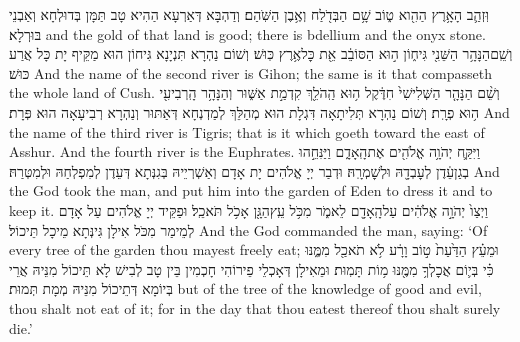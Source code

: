 {וּֽזְהַ֛ב הָאָ֥רֶץ הַהִ֖וא ט֑וֹב שָׁ֥ם הַבְּדֹ֖לַח וְאֶ֥בֶן הַשֹּֽׁהַם׃}
{וְדַהְבָּא דְּאַרְעָא הַהִיא טָב תַּמָּן בְּדוּלְחָא וְאַבְנֵי בּוּרְלָא׃}
{and the gold of that land is good; there is bdellium and the onyx stone.}{}
{וְשֵֽׁם\maqqaf הַנָּהָ֥ר הַשֵּׁנִ֖י גִּיח֑וֹן ה֣וּא הַסּוֹבֵ֔ב אֵ֖ת כׇּל\maqqaf אֶ֥רֶץ כּֽוּשׁ׃}
{וְשׁוֹם נַהְרָא תִּנְיָנָא גִּיחוֹן הוּא מַקֵּיף יָת כָּל אֲרַע כּוּשׁ׃}
{And the name of the second river is Gihon; the same is it that compasseth the whole land of Cush.}{}
{וְשֵׁ֨ם הַנָּהָ֤ר הַשְּׁלִישִׁי֙ חִדֶּ֔קֶל ה֥וּא הַֽהֹלֵ֖ךְ קִדְמַ֣ת אַשּׁ֑וּר וְהַנָּהָ֥ר הָֽרְבִיעִ֖י ה֥וּא פְרָֽת׃}
{וְשׁוֹם נַהְרָא תְּלִיתָאָה דִּגְלָת הוּא מְהַלֵּךְ לְמַדְנְחָא דְּאַתּוּר וְנַהְרָא רְבִיעָאָה הוּא פְּרָת׃}
{And the name of the third river is Tigris; that is it which goeth toward the east of Asshur. And the fourth river is the Euphrates.}{}
{וַיִּקַּ֛ח יְהֹוָ֥ה אֱלֹהִ֖ים אֶת\maqqaf הָֽאָדָ֑ם וַיַּנִּחֵ֣הוּ בְגַן\maqqaf עֵ֔דֶן לְעׇבְדָ֖הּ וּלְשׇׁמְרָֽהּ׃}
{וּדְבַר יְיָ אֱלֹהִים יָת אָדָם וְאַשְׁרְיֵיהּ בְּגִנְּתָא דְּעֵדֶן לְמִפְלְחַהּ וּלְמִטְּרַהּ׃}
{And the \lord\space God took the man, and put him into the garden of Eden to dress it and to keep it.}{}
{וַיְצַו֙ יְהֹוָ֣ה אֱלֹהִ֔ים עַל\maqqaf הָֽאָדָ֖ם לֵאמֹ֑ר מִכֹּ֥ל עֵֽץ\maqqaf הַגָּ֖ן אָכֹ֥ל תֹּאכֵֽל׃}
{וּפַקֵּיד יְיָ אֱלֹהִים עַל אָדָם לְמֵימַר מִכֹּל אִילָן גִּינְּתָא מֵיכָל תֵּיכוֹל׃}
{And the \lord\space God commanded the man, saying: ‘Of every tree of the garden thou mayest freely eat;}{}
{וּמֵעֵ֗ץ הַדַּ֙עַת֙ ט֣וֹב וָרָ֔ע לֹ֥א תֹאכַ֖ל מִמֶּ֑נּוּ כִּ֗י בְּי֛וֹם אֲכׇלְךָ֥ מִמֶּ֖נּוּ מ֥וֹת תָּמֽוּת׃}
{וּמֵאִילָן דְּאָכְלֵי פֵירוֹהִי חָכְמִין בֵּין טָב לְבִישׁ לָא תֵּיכוֹל מִנֵּיהּ אֲרֵי בְּיוֹמָא דְּתֵיכוֹל מִנֵּיהּ מְמָת תְּמוּת׃}
{but of the tree of the knowledge of good and evil, thou shalt not eat of it; for in the day that thou eatest thereof thou shalt surely die.’}{}
